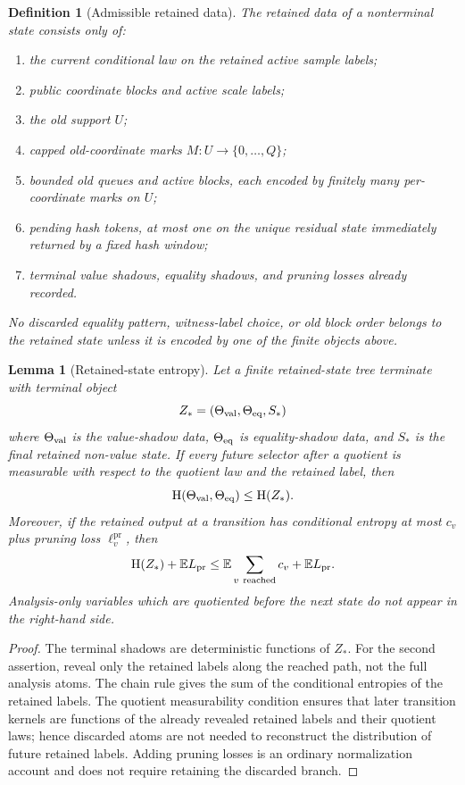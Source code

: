 \documentclass[11pt]{article}
\newtheorem{lemma}[theorem]{Lemma}
\newtheorem{definition}[theorem]{Definition}
\theoremstyle{remark}
\newcommand{\E}{\mathbb E}
\newcommand{\HH}{\mathrm H}
\newcommand{\pr}{\mathrm{pr}}
\begin{document}
\begin{definition}[Admissible retained data]
The retained data of a nonterminal state consists only of:
\begin{enumerate}[label=\textup{(\roman*)}]
\item the current conditional law on the retained active sample labels;
\item public coordinate blocks and active scale labels;
\item the old support $U$;
\item capped old-coordinate marks $M:U\to\{0,\ldots,Q\}$;
\item bounded old queues and active blocks, each encoded by finitely many per-coordinate marks on $U$;
\item pending hash tokens, at most one on the unique residual state immediately returned by a fixed hash window;
\item terminal value shadows, equality shadows, and pruning losses already recorded.
\end{enumerate}
No discarded equality pattern, witness-label choice, or old block order belongs to the retained state unless it is encoded by one of the finite objects above.
\end{definition}

\begin{lemma}[Retained-state entropy]\label{lem:retained-entropy}
Let a finite retained-state tree terminate with terminal object
\[
        Z_*=(\Theta_{\rm val},\Theta_{\rm eq},S_*)
\]
where $\Theta_{\rm val}$ is the value-shadow data, $\Theta_{\rm eq}$ is equality-shadow data, and $S_*$ is the final retained non-value state.  If every future selector after a quotient is measurable with respect to the quotient law and the retained label, then
\[
        \HH(\Theta_{\rm val},\Theta_{\rm eq})\le \HH(Z_*).
\]
Moreover, if the retained output at a transition has conditional entropy at most $c_v$ plus pruning loss $\ell^{\pr}_v$, then
\[
        \HH(Z_*)+\E L_{\pr}\le \E\sum_{v\ {\rm reached}} c_v+\E L_{\pr}.
\]
Analysis-only variables which are quotiented before the next state do not appear in the right-hand side.
\end{lemma}

\begin{proof}
The terminal shadows are deterministic functions of $Z_*$.  For the second assertion, reveal only the retained labels along the reached path, not the full analysis atoms.  The chain rule gives the sum of the conditional entropies of the retained labels.  The quotient measurability condition ensures that later transition kernels are functions of the already revealed retained labels and their quotient laws; hence discarded atoms are not needed to reconstruct the distribution of future retained labels.  Adding pruning losses is an ordinary normalization account and does not require retaining the discarded branch.
\end{proof}
\end{document}

